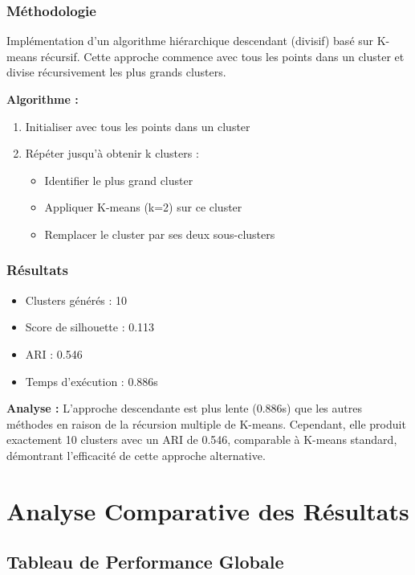 \documentclass[12pt,a4paper]{article}
\begin{document}
\subsubsection{Méthodologie}

Implémentation d'un algorithme hiérarchique descendant (divisif) basé sur K-means récursif. Cette approche commence avec tous les points dans un cluster et divise récursivement les plus grands clusters.

\textbf{Algorithme :}
\begin{enumerate}
    \item Initialiser avec tous les points dans un cluster
    \item Répéter jusqu'à obtenir k clusters :
    \begin{itemize}
        \item Identifier le plus grand cluster
        \item Appliquer K-means (k=2) sur ce cluster
        \item Remplacer le cluster par ses deux sous-clusters
    \end{itemize}
\end{enumerate}

\subsubsection{Résultats}

\begin{itemize}
    \item Clusters générés : 10
    \item Score de silhouette : 0.113
    \item ARI : 0.546
    \item Temps d'exécution : 0.886s
\end{itemize}

\textbf{Analyse :} L'approche descendante est plus lente (0.886s) que les autres méthodes en raison de la récursion multiple de K-means. Cependant, elle produit exactement 10 clusters avec un ARI de 0.546, comparable à K-means standard, démontrant l'efficacité de cette approche alternative.

\section{Analyse Comparative des Résultats}

\subsection{Tableau de Performance Globale}
\end{document}
